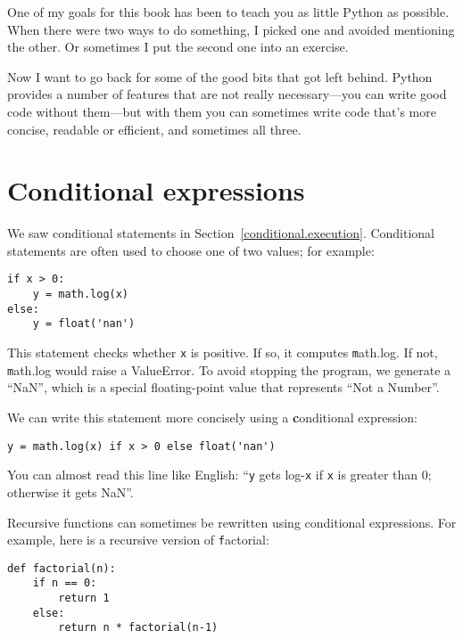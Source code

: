 \documentclass[
DIV=11,
fontsize=13,
twoside,
headinclude=false,
titlepage=firstiscover,
abstract=true,
headsepline=true,
footsepline=true,
chapterprefix=true, %
headings=big,
bibliography=totoc,%
captions=tableheading
]{scrbook}
\theoremstyle{definition}
\begin{document}
One of my goals for this book has been to teach you as little Python
as possible.  When there were two ways to do something, I picked 
one and avoided mentioning the other.  Or sometimes I put the second
one into an exercise.

Now I want to go back for some of the good bits that got left behind.
Python provides a number of features that are not really necessary---you
can write good code without them---but with them you can sometimes
write code that's more concise, readable or efficient, and sometimes
all three.


\section{Conditional expressions}

We saw conditional statements in Section~\ref{conditional.execution}.
Conditional statements are often used to choose one of two values;
for example:

\begin{lstlisting}
if x > 0:
    y = math.log(x)
else:
    y = float('nan')
\end{lstlisting}

This statement checks whether {\texttt x} is positive.  If so, it computes
{\texttt math.log}.  If not, {\texttt math.log} would raise a ValueError.  To
avoid stopping the program, we generate a ``NaN'', which is a special
floating-point value that represents ``Not a Number''.

We can write this statement more concisely using a {\textbf conditional
expression}:

\begin{lstlisting}
y = math.log(x) if x > 0 else float('nan')
\end{lstlisting}

You can almost read this line like English: ``{\texttt y} gets log-{\texttt x}
if {\texttt x} is greater than 0; otherwise it gets NaN''.

Recursive functions can sometimes be rewritten using conditional
expressions.  For example, here is a recursive version of {\texttt factorial}:

\begin{lstlisting}
def factorial(n):
    if n == 0:
        return 1
    else:
        return n * factorial(n-1)
\end{lstlisting}
\end{document}
